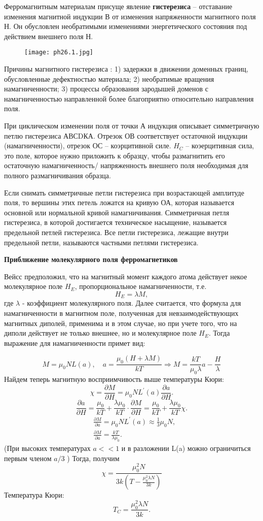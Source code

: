 Ферромагнитным материалам присуще явление \textbf{гистерезиса} – отставание изменения магнитной индукции В от изменения напряженности магнитного поля Н. Он обусловлен необратимыми изменениями энергетического состояния под действием внешнего поля Н. 
\begin{figure}[h!]
    \centering
    \texttt{[image: ph26.1.jpg]}
\end{figure}

Причины магнитного
гистерезиса : 1) задержки в движении доменных границ, обусловленные
дефектностью материала; 2) необратимые вращения намагниченности; 3) процессы
образования зародышей доменов с намагниченностью направленной более
благоприятно относительно направления поля.


При циклическом изменении поля от точки А индукция описывает
симметричную петлю гистерезиса АВСDКА. Отрезок ОВ соответствует остаточной
индукции (намагниченности), отрезок ОС – коэрцитивной силе. $H_C$ – коэерцитивная сила, это поле, которое нужно приложить к образцу, чтобы
размагнитить его остаточную намагниченность/ напряженность внешнего поля
необходимая для полного размагничивания образца.


Если снимать
симметричные петли гистерезиса при возрастающей амплитуде поля, то
вершины этих петель ложатся на кривую ОА, которая называется основной или
нормальной кривой намагничивания. Симметричная петля гистерезиса, в которой
достигается техническое насыщение, называется предельной петлей гистерезиса. Все
петли гистерезиса, лежащие внутри предельной петли, называются частными
петлями гистерезиса. 


\textbf{Приближение молекулярного поля ферромагнетиков}


Вейсс предположил, что на магнитный момент каждого атома действует некое молекулярное поле $ H_{E} $, пропорциональное намагниченности, т.е.
$$
H_E=\lambda M,
$$
где $\lambda$ - коэффициент молекулярного поля. Далее считается, что формула для
намагниченности в магнитном поле, полученная для невзаимодействующих
магнитных диполей, применима и в этом случае, но при учете того, что на
диполи действует не только внешнее, но и молекулярное поле $ H_{E} $. Тогда выражение для намагниченности примет вид:

$$
M=\mu_0 N L(a), \quad
a=\frac{\mu_0(H+\lambda M)}{k T}
 \Rightarrow
M=\frac{k T}{\mu_0 \lambda} a-\frac{H}{\lambda}
$$
Найдем теперь магнитную восприимчивость выше температуры Кюри:
$$
\chi=\frac{\partial M}{\partial H}=\mu_0 N L^{\prime}(a) \frac{\partial a}{\partial H}.
$$
$$
\frac{\partial a}{\partial H}=\frac{\mu_0}{k T}+\frac{\lambda \mu_0}{k T} \cdot \frac{\partial M}{\partial H}=\frac{\mu_0}{k T}+\frac{\lambda \mu_0}{k T} \chi.
$$
$$
\begin{aligned}
& \frac{\partial M}{\partial a}=\mu_0 N L^{\prime}(a) \approx \frac{1}{3} \mu_0 N, \\
& \frac{\partial M}{\partial a}=\frac{k T}{\lambda \mu_0}.
\end{aligned}
$$
(При высоких температурах $a<<1$ и в разложении L(a) можно ограничиться первым членом $a / 3$ ) Тогда, получим
$$
\chi=\frac{\mu_0^2 N}{3 k\left(T-\frac{\mu_0^2 \lambda N}{3 k}\right)}
$$
Температура Кюри:
$$
T_C=\frac{\mu_0^2 \lambda N}{3 k}.
$$

